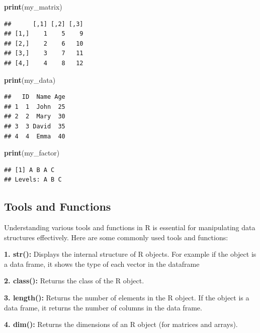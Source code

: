 \documentclass[
]{book}
\newenvironment{Shaded}{\begin{snugshade}}{\end{snugshade}}
\newcommand{\FunctionTok}[1]{\textcolor[rgb]{0.13,0.29,0.53}{\textbf{#1}}}
\newcommand{\NormalTok}[1]{#1}
\begin{document}
\begin{Shaded}
\begin{Highlighting}[]
\FunctionTok{print}\NormalTok{(my\_matrix)}
\end{Highlighting}
\end{Shaded}

\begin{verbatim}
##      [,1] [,2] [,3]
## [1,]    1    5    9
## [2,]    2    6   10
## [3,]    3    7   11
## [4,]    4    8   12
\end{verbatim}

\begin{Shaded}
\begin{Highlighting}[]
\FunctionTok{print}\NormalTok{(my\_data)}
\end{Highlighting}
\end{Shaded}

\begin{verbatim}
##   ID  Name Age
## 1  1  John  25
## 2  2  Mary  30
## 3  3 David  35
## 4  4  Emma  40
\end{verbatim}

\begin{Shaded}
\begin{Highlighting}[]
\FunctionTok{print}\NormalTok{(my\_factor)}
\end{Highlighting}
\end{Shaded}

\begin{verbatim}
## [1] A B A C
## Levels: A B C
\end{verbatim}

\subsection{Tools and Functions}\label{tools-and-functions}

Understanding various tools and functions in R is essential for manipulating data structures effectively. Here are some commonly used tools and functions:

\textbf{1. str():} Displays the internal structure of R objects. For example if the object is a data frame, it shows the type of each vector in the dataframe

\textbf{2. class():} Returns the class of the R object.

\textbf{3. length():} Returns the number of elements in the R object. If the object is a data frame, it returns the number of columns in the data frame.

\textbf{4. dim():} Returns the dimensions of an R object (for matrices and arrays).
\end{document}
